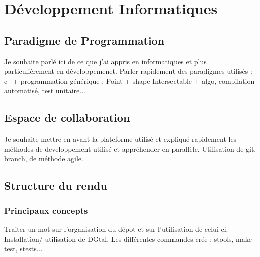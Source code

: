 \section{Développement Informatiques}


\subsection{Paradigme de Programmation}

Je souhaite parlé ici de ce que j'ai appris en informatiques et plus particulièrement en développemenet. Parler rapidement des paradigmes utilisés : c++ programmation générique : Point + shape Intersectable + algo, compilation automatisé, test unitaire...

\subsection{Espace de collaboration}

Je souhaite mettre en avant la plateforme utilisé et expliqué rapidement les méthodes de developpement utilisé et appréhender en parallèle. Utilisation de git, branch, de méthode agile.

\subsection{Structure du rendu}

\subsubsection{Principaux concepts}

Traiter un mot sur l'organisation du dépot et sur l'utilisation de celui-ci.
Installation/ utilisation de DGtal.
Les différentes commandes crée : stools, make test, stests...

